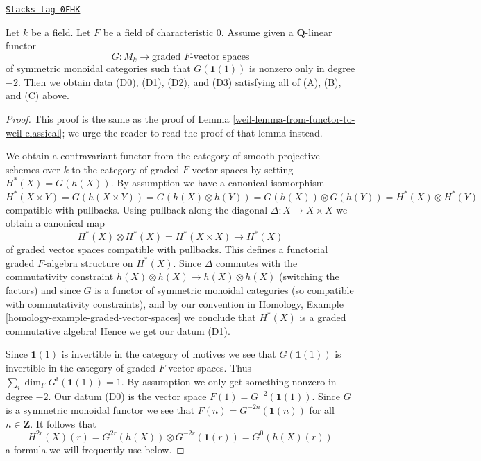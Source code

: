 \begin{lemma}
\label{weil-lemma-from-functor-to-weil}
\href{https://stacks.math.columbia.edu/tag/0FHK}{\texttt{Stacks tag 0FHK}}

Let $k$ be a field. Let $F$ be a field of characteristic $0$.
Assume given a $\mathbf{Q}$-linear functor
$$
G : M_k \longrightarrow \text{graded }F\text{-vector spaces}
$$
of symmetric monoidal categories such that $G(\mathbf{1}(1))$
is nonzero only in degree $-2$. Then we obtain data (D0), (D1), (D2), and (D3)
satisfying all of (A), (B), and (C) above.
\end{lemma}

\begin{proof}

This proof is the same as the proof of
Lemma \ref{weil-lemma-from-functor-to-weil-classical};
we urge the reader to read the proof of that lemma instead.

\medskip\noindent
We obtain a contravariant functor from the category of smooth
projective schemes over $k$ to the category of graded $F$-vector spaces
by setting $H^*(X) = G(h(X))$. By assumption we have a canonical
isomorphism
$$
H^*(X \times Y) = G(h(X \times Y)) = G(h(X) \otimes h(Y)) =
G(h(X)) \otimes G(h(Y)) = H^*(X) \otimes H^*(Y)
$$
compatible with pullbacks. Using pullback along the diagonal
$\Delta : X \to X \times X$ we obtain a canonical map
$$
H^*(X) \otimes H^*(X) = H^*(X \times X) \to H^*(X)
$$
of graded vector spaces compatible with pullbacks.
This defines a functorial graded $F$-algebra structure on
$H^*(X)$. Since $\Delta$ commutes with the commutativity
constraint $h(X) \otimes h(X) \to h(X) \otimes h(X)$ (switching the factors)
and since $G$ is a functor of symmetric monoidal categories (so compatible with
commutativity constraints), and by our convention in
Homology, Example \ref{homology-example-graded-vector-spaces}
we conclude that $H^*(X)$ is a graded
commutative algebra! Hence we get our datum (D1).

\medskip\noindent
Since $\mathbf{1}(1)$ is invertible in the category of motives
we see that $G(\mathbf{1}(1))$ is invertible in the category of
graded $F$-vector spaces. Thus $\sum_i \dim_F G^i(\mathbf{1}(1)) = 1$.
By assumption we only get something nonzero in degree $-2$.
Our datum (D0) is the vector space $F(1) = G^{-2}(\mathbf{1}(1))$.
Since $G$ is a symmetric monoidal functor we see that
$F(n) = G^{-2n}(\mathbf{1}(n))$ for all $n \in \mathbf{Z}$.
It follows that
$$
H^{2r}(X)(r) = G^{2r}(h(X)) \otimes G^{-2r}(\mathbf{1}(r)) =
G^0(h(X)(r))
$$
a formula we will frequently use below.


\end{proof}
